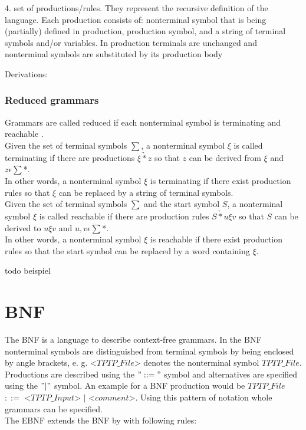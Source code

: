 4. set of productions/rules. They represent the recursive definition of the language. Each production consists of: nonterminal symbol that is being (partially) defined in production, production symbol, and a string of terminal symbols and/or variables.
In production terminals are unchanged and nonterminal symbols are substituted by its production body

Derivations:


\cite{AutomataTheory.2007}
\subsubsection{Reduced grammars}
Grammars are called reduced if each nonterminal symbol is terminating and reachable \cite{Cremers75}. \\
Given the set of terminal symbols $\sum$, a nonterminal symbol $\xi$ is called terminating if there are productions $\xi \underrightarrow{*} z$ so that $z$ can be derived from $\xi$ and $z \epsilon \sum$*. \\
In other words, a nonterminal symbol $\xi$ is terminating if there exist production rules so that  $\xi$ can be replaced by a string of terminal symbols. \cite{Cremers75}\\
Given the set of terminal symbols $\sum$ and the start symbol $S$, a nonterminal symbol $\xi$ is called reachable if there are production rules $S \underrightarrow{*} u\xi v$ so that $S$ can be derived to $u\xi v$ and $u,v \epsilon \sum$*. \\
In other words, a nonterminal symbol $\xi$ is reachable if there exist production rules so that the start symbol can be replaced by a word containing $\xi$. \cite{Cremers75}

todo beispiel
\section{\acf{BNF}}\label{sec:BackgroundBNF}
The \acf{BNF} is a language to describe context-free grammars.
In the \acf{BNF} nonterminal symbols are distinguished from terminal symbols by being enclosed by  angle brackets, e. g. <$TPTP\_File$> denotes the nonterminal symbol $TPTP\_File$.
Productions are described using the $"::="$ symbol and alternatives are specified using the $"|"$ symbol. \cite{BNF.1964}
An example for a \ac{BNF} production would be $TPTP\_File$ $::=$ <$TPTP\_Input$> $|$ <$comment$>.
Using this pattern of notation whole grammars can be specified.\\
The \ac{EBNF} extends the \ac{BNF} by with following rules:

